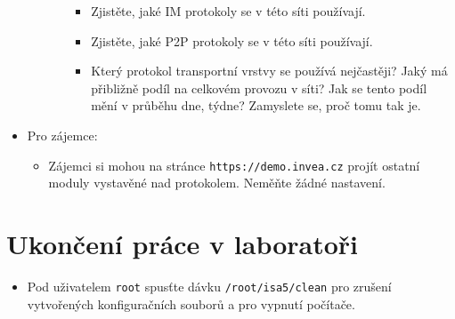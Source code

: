 \begin{itemize}
\begin{enumerate}
\begin{enumerate}
\begin{itemize}
                   \item Zjistěte, jaké IM protokoly se v této síti používají.
                   \item Zjistěte, jaké P2P protokoly se v této síti používají.
                   \item Který protokol transportní vrstvy se používá
                   nejčastěji? Jaký má přibližně podíl na celkovém provozu v
                   síti? Jak se tento podíl mění v průběhu dne, týdne? Zamyslete
                   se, proč tomu tak je.
                \end{itemize}
            \end{enumerate}       
        \end{enumerate} 
    \item Pro zájemce:
        \begin{itemize}
            \item Zájemci si mohou na stránce {\tt https://demo.invea.cz} projít
      ostatní moduly vystavěné nad protokolem. Neměňte žádné nastavení.
        \end{itemize}
    \end{itemize}
 
\section*{Ukončení práce v laboratoři}
\begin{itemize}
  \item Pod uživatelem {\tt root} spusťte dávku {\tt /root/isa5/clean} pro zrušení
  vytvořených konfiguračních souborů a pro vypnutí počítače.
\end{itemize}

